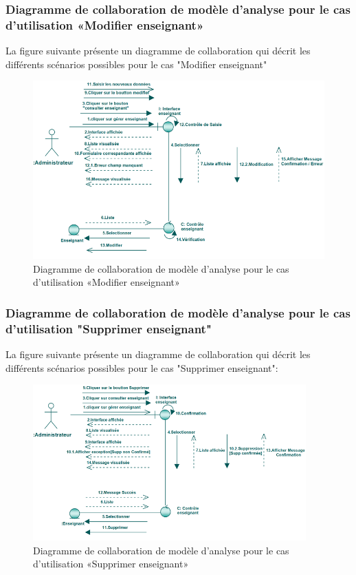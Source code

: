 \documentclass[12 pt]{report}
\begin{document}
\subsubsection{Diagramme  de  collaboration  de  modèle  d'analyse  pour  le  cas  d'utilisation «Modifier enseignant»  }
La figure suivante présente un diagramme de collaboration qui décrit les différents
scénarios possibles pour le cas "Modifier enseignant"
\begin{figure}[h]
\begin{center}
\includegraphics[width= 14 cm , height =6 cm]{colla_adm_modifierenseignant.png}
 \caption{Diagramme  de  collaboration  de  modèle  d'analyse  pour  le  cas  d'utilisation «Modifier enseignant»}
\end{center}
\end{figure}
\subsubsection{Diagramme  de  collaboration  de  modèle  d'analyse  pour  le  cas  d'utilisation "Supprimer enseignant"  }
La figure suivante présente un diagramme de collaboration qui décrit les différents
scénarios possibles pour le cas "Supprimer enseignant":
\begin{figure}[h]
\begin{center}
\includegraphics[width= 12 cm , height =6cm]{colla_adm_supprimerenseignant.png}
 \caption{Diagramme  de  collaboration  de  modèle  d'analyse  pour  le  cas  d'utilisation «Supprimer enseignant» }
\end{center}
\end{figure}
\end{document}
